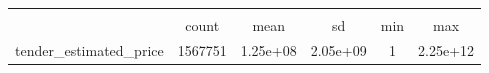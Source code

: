 {
\def\sym#1{\ifmmode^{#1}\else\(^{#1}\)\fi}
\begin{tabular}{l*{1}{ccccc}}
\hline\hline
                    &\multicolumn{5}{c}{}                                            \\
                    &       count&        mean&          sd&         min&         max\\
\hline
tender\_estimated\_price&     1567751&    1.25e+08&    2.05e+09&           1&    2.25e+12\\
\hline\hline
\end{tabular}
}
